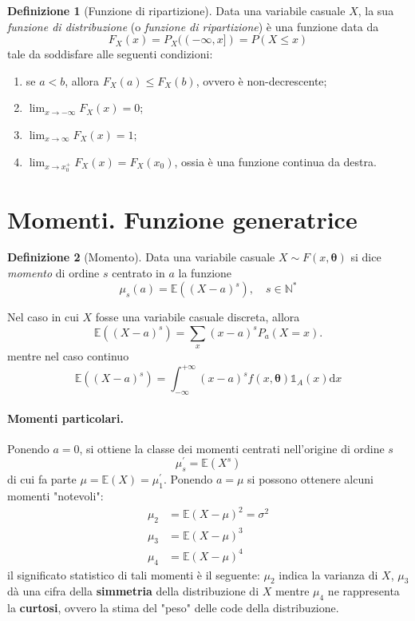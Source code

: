 \documentclass[fontsize=11pt,paper=A4,oneside,index=totoc,hyperref]{book}
\theoremstyle{definition}
\newtheorem{dfn}{Definizione}[]
\theoremstyle{plain}
\newcommand{\Asp}{\mathbb{E}}
\newcommand{\Ind}{\mathbb{1}}
\begin{document}
\begin{dfn}[Funzione di ripartizione]
  Data una variabile casuale \(X\), la sua \emph{funzione di distribuzione} (o \emph{funzione di ripartizione}) è una funzione data da
  \begin{equation}
    F_X(x) = P_X((-\infty,x]) = P(X \le x)
  \end{equation}
  tale da soddisfare alle seguenti condizioni:
  \begin{enumerate}
    \item se \(a<b\), allora \(F_X(a) \le F_X(b)\), ovvero è non-decrescente;
    \item \(\lim_{x\to-\infty}F_X(x) = 0\);
    \item \(\lim_{x\to\infty}F_X(x) = 1\);
    \item \(\lim_{x\to x_0^{+}} F_X(x) = F_X(x_0)\), ossia è una funzione continua da destra.
  \end{enumerate}
\end{dfn}

\section{Momenti. Funzione generatrice}
\begin{dfn}[Momento]
  Data una variabile casuale \(X \sim F(x, {\boldsymbol{\theta}})\) si dice \emph{momento} di ordine \(s\) centrato in \(a\) la funzione
  \[
  \mu_s(a) = \Asp((X - a)^s),\quad s \in \mathbb{N}^{*}
  \]
\end{dfn}
Nel caso in cui \(X\) fosse una variabile casuale discreta, allora
\[
\Asp((X-a)^s) = \sum_{x}(x-a)^sP_a(X = x).
\]
mentre nel caso continuo
\[
\Asp((X-a)^s) = \int_{-\infty}^{+\infty}(x-a)^s f(x, {\boldsymbol{\theta}}) \Ind_A(x)\mathrm{d}x
\]

\paragraph{Momenti particolari.} Ponendo \(a = 0\), si ottiene la classe dei momenti centrati nell'origine di ordine \(s\)
\[
\mu_s^\prime = \Asp(X^s)
\]
di cui fa parte \(\mu = \Asp(X) = \mu_1^\prime\). Ponendo \(a = \mu\) si possono ottenere alcuni momenti "notevoli":
\begin{align*}
  \mu_2 &= \Asp(X - \mu)^2 = \sigma^2 \\
  \mu_3 &= \Asp(X - \mu)^3 \\
  \mu_4 &= \Asp(X - \mu)^4
\end{align*}
il significato statistico di tali momenti è il seguente: \(\mu_2\) indica la varianza di \(X\), \(\mu_3\) dà una cifra della {\bf simmetria} della distribuzione di \(X\) mentre \(\mu_4\) ne rappresenta la {\bf curtosi}, ovvero la stima del "peso" delle code della distribuzione.
\end{document}

